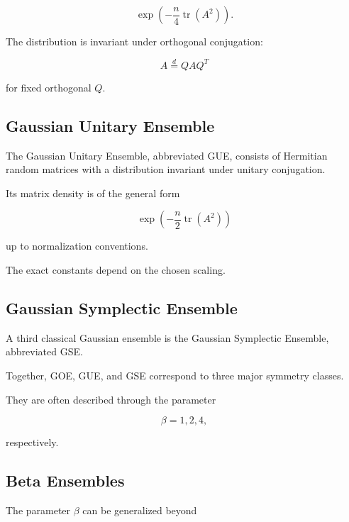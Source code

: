\[
\boxed{
\exp
\left(
-\frac{n}{4}
\operatorname{tr}(A^2)
\right).
}
\]

The distribution is invariant under orthogonal conjugation:

\[
\boxed{
A
\overset{d}{=}
Q A Q^T
}
\]

for fixed orthogonal \(Q\).

\subsection{Gaussian Unitary Ensemble}
\label{subsec:gue}

The Gaussian Unitary Ensemble, abbreviated GUE, consists of Hermitian
random matrices with a distribution invariant under unitary
conjugation.

Its matrix density is of the general form

\[
\boxed{
\exp
\left(
-\frac{n}{2}
\operatorname{tr}(A^2)
\right)
}
\]

up to normalization conventions.

The exact constants depend on the chosen scaling.

\subsection{Gaussian Symplectic Ensemble}
\label{subsec:gse}

A third classical Gaussian ensemble is the Gaussian Symplectic
Ensemble, abbreviated GSE.

Together, GOE, GUE, and GSE correspond to three major symmetry classes.

They are often described through the parameter

\[
\boxed{
\beta
=
1,2,4,
}
\]

respectively.

\subsection{Beta Ensembles}
\label{subsec:beta-ensembles}

The parameter \(\beta\) can be generalized beyond

